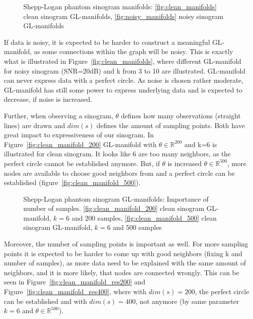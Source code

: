 \begin{figure}[H]
    \centering
    \hfill
    \hfill
    \hfill
    \caption{Shepp-Logan phantom sinogram manifolds:
    \ref{fig:clean_manifolds} clean sinogram GL-manifolds,
    \ref{fig:noisy_manifolds} noisy sinogram GL-manifolds}
\end{figure}

If data is noisy, it is expected to be harder to construct a meaningful GL-manifold, as some connections within
the graph will be noisy. This is exactly what is illustrated in Figure~\ref{fig:clean_manifolds}, where 
different GL-manifold for noisy sinogram (SNR=20dB) and k from 3 to 10 are illustrated.
GL-manifold can never express data with a perfect circle. As noise is chosen rather moderate, GL-manifold has still some 
power to express underlying data and is expected to decrease, if noise is increased.


Further, when observing a sinogram, $\theta$ defines how many observations (straight lines) are drawn
and $dim(s)$ defines the amount of sampling points. Both have great impact to expressiveness of our sinogram.
In Figure~\ref{fig:clean_manifold_200} GL-manifold with $\theta \in \mathbb{R}^{200}$ and k=6 is illustrated
for clean sinogram. It looks like 6 are too many neighbors, as the perfect circle cannot be established anymore.
But, if $\theta$ is increased $\theta \in \mathbb{R}^{500}$, more nodes are available to choose good neighbors from
and a perfect circle can be established (figure~\ref{fig:clean_manifold_500}).

\begin{figure}[H]
    \centering
    \hfill
    \hfill
    \hfill
    \caption{Shepp-Logan phantom sinogram GL-manifolds: Importance of number of samples.
    \ref{fig:clean_manifold_200} clean sinogram GL-manifold, $k = 6$ and 200 samples,
    \ref{fig:clean_manifold_500} clean sinogram GL-manifold, $k = 6$ and 500 samples}
\end{figure}

Moreover, the number of sampling points is important as well.
For more sampling points it is expected to be harder to come up with good neighbors (fixing k and number of samples),
as more data need to be explained with the same amount of neighbors, and it is more likely, that nodes are connected wrongly.
This can be seen in Figure~\ref{fig:clean_manifold_res200} and Figure~\ref{fig:clean_manifold_res400}, where with $dim(s) = 200$,
the perfect circle can be established and with $dim(s) = 400$, not anymore (by same parameter $k = 6$ and $\theta \in \mathbb{R}^{500}$).

